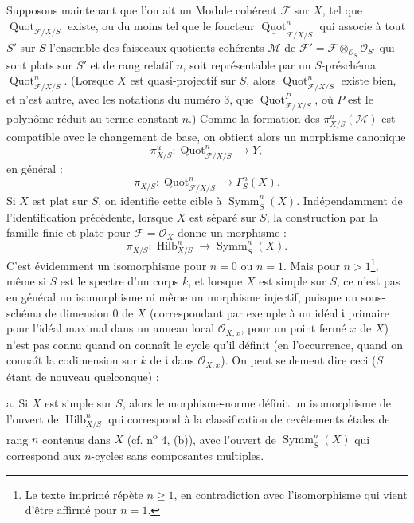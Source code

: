 Supposons maintenant que l'on ait un Module cohérent $\mathcal F$ sur $X$, tel
que $\operatorname{Quot}_{\mathcal F/X/S}$ existe, ou du moins tel que le
foncteur $\underline{\operatorname{Quot}}^n_{\mathcal F/X/S}$ qui associe à
tout $S'$ sur $S$ l'ensemble des faisceaux quotients cohérents $\mathcal M$ de
$\mathcal F'=\mathcal F\otimes_{\mathcal O_S}\mathcal O_{S'}$ qui sont plats
sur $S'$ et de rang relatif $n$, soit représentable par un $S$-préschéma
$\operatorname{Quot}^n_{\mathcal F/X/S}$. (Lorsque $X$ est quasi-projectif sur
$S$, alors $\operatorname{Quot}^n_{\mathcal F/X/S}$ existe bien, et n'est
autre, avec les notations du numéro 3, que
$\operatorname{Quot}^P_{\mathcal F/X/S}$, où $P$ est le polynôme réduit au
terme constant $n$.) Comme la formation des $\pi^u_{X/S}(\mathcal M)$ est
compatible avec le changement de base, on obtient alors un morphisme canonique
\[
\pi^u_{X/S}:\operatorname{Quot}^n_{\mathcal F/X/S}\longrightarrow Y,
\]
en général : \[ \pi_{X/S}:\operatorname{Quot}^n_{\mathcal F/X/S} \longrightarrow\Gamma^n_S(X). \] Si $X$ est plat sur $S$, on identifie cette cible à $\operatorname{Symm}^n_S(X)$.
Indépendamment de l'identification précédente, lorsque $X$ est séparé sur $S$, la construction par la famille finie et plate pour $\mathcal F=\mathcal O_X$ donne un morphisme :
\[
\pi_{X/S}:\operatorname{Hilb}^n_{X/S}
\longrightarrow\operatorname{Symm}^n_S(X).
\]
C'est évidemment un isomorphisme pour $n=0$ ou $n=1$. Mais pour
$n>1$\footnote{Le texte imprimé répète $n\geq1$, en contradiction avec
l'isomorphisme qui vient d'être affirmé pour $n=1$.}, même
si $S$ est le spectre d'un corps $k$, et lorsque $X$ est simple sur $S$, ce
n'est pas en général un isomorphisme ni même un morphisme injectif, puisque un
sous-schéma de dimension 0 de $X$ (correspondant par exemple à un idéal
$\mathfrak i$ primaire pour l'idéal maximal dans un anneau local
$\mathcal O_{X,x}$, pour un point fermé $x$ de $X$) n'est pas connu quand on
connaît le cycle qu'il définit (en l'occurrence, quand on connaît la codimension
sur $k$ de $\mathfrak i$ dans $\mathcal O_{X,x}$). On peut seulement dire ceci
($S$ étant de nouveau quelconque) :

\medskip
\noindent a. Si $X$ est simple sur $S$, alors le morphisme-norme définit un
isomorphisme de l'ouvert de $\operatorname{Hilb}^n_{X/S}$ qui correspond à la
classification de revêtements étales de rang $n$ contenus dans $X$ (cf.
n\textsuperscript{o} 4, (b)), avec l'ouvert de
$\operatorname{Symm}^n_S(X)$ qui correspond aux $n$-cycles sans composantes
multiples.

